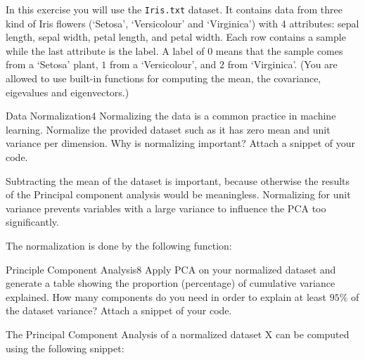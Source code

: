 \newif\ifvimbug
\vimbugfalse

\ifvimbug

\fi

In this exercise you will use the \texttt{Iris.txt} dataset. It contains data from three kind of Iris flowers (`Setosa', `Versicolour' and `Virginica') with 4 attributes: sepal length, sepal width, petal length, and petal width. Each row contains a sample while the last attribute is the label. A label of $0$ means that the sample comes from a `Setosa' plant, $1$ from a `Versicolour', and $2$ from `Virginica'.
(You are allowed to use built-in functions for computing the mean, the covariance, eigevalues and eigenvectors.)

\begin{questions}


\begin{question}{Data Normalization}{4}
Normalizing the data is a common practice in machine learning. Normalize the provided dataset such as it has zero mean and unit variance per dimension. Why is normalizing important?
Attach a snippet of your code. 

\begin{answer}
Subtracting the mean of the dataset is important, because otherwise the results of the Principal component analysis would be meaningless. Normalizing for unit variance prevents variables with a large variance to influence the PCA too significantly.

The normalization is done by the following function:

	
\end{answer}

\end{question}


\begin{question}{Principle Component Analysis}{8}
Apply PCA on your normalized dataset and generate a table showing the proportion (percentage) of cumulative variance explained. 
How many components do you need in order to explain at least $95\%$ of the dataset variance? 
Attach a snippet of your code.

\begin{answer}
The Principal Component Analysis of a normalized dataset X can be computed using the following snippet:


\end{answer}
\end{question}
\end{questions}
